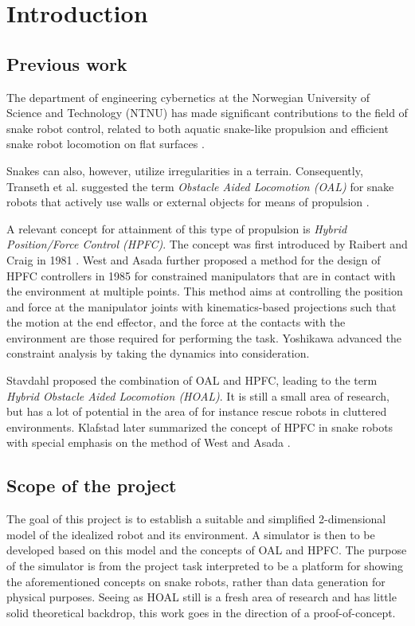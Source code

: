 
\chapter{Introduction}\label{chapter:introduction}

\section{Previous work}
The department of engineering cybernetics at the Norwegian University of Science and Technology (NTNU) has made significant contributions to the field of snake robot control, related to both aquatic snake-like propulsion and efficient snake robot locomotion on flat surfaces \cite{StavdahlNote}.

Snakes can also, however, utilize irregularities in a terrain. Consequently, Transeth et al. suggested the term \textit{Obstacle Aided Locomotion (OAL)} for snake robots that actively use walls or external objects for means of propulsion \cite{transeth2008snake}.

A relevant concept for attainment of this type of propulsion is \textit{Hybrid Position/Force Control (HPFC)}. The concept was first introduced by Raibert and Craig in 1981 \cite{raibert1981hybrid}. West and Asada \cite{west1985method} further proposed a method for the design of HPFC controllers in 1985 for constrained manipulators that are in contact with the environment at multiple points. This method aims at controlling the position and force at the manipulator joints with kinematics-based projections such that the motion at the end effector, and the force at the contacts with the environment are those required for performing the task. Yoshikawa \cite{yoshikawa1987dynamic} advanced the constraint analysis by taking the dynamics into consideration.


Stavdahl \cite{StavdahlNote} proposed the combination of OAL and HPFC, leading to the term \textit{Hybrid Obstacle Aided Locomotion (HOAL)}. It is still a small area of research, but has a lot of potential in the area of for instance rescue robots in cluttered environments. Klafstad \cite{TorjusOppg} later summarized the concept of HPFC in snake robots with special emphasis on the method of West and Asada \cite{west1985method}.

\section{Scope of the project}
The goal of this project is to establish a suitable and simplified 2-dimensional model of the idealized robot and its environment. A simulator is then to be developed based on this model and the concepts of OAL and HPFC. The purpose of the simulator is from the project task interpreted to be a platform for showing the aforementioned concepts on snake robots, rather than data generation for physical purposes.
Seeing as HOAL still is a fresh area of research and has little solid theoretical backdrop, this work goes in the direction of a proof-of-concept.

